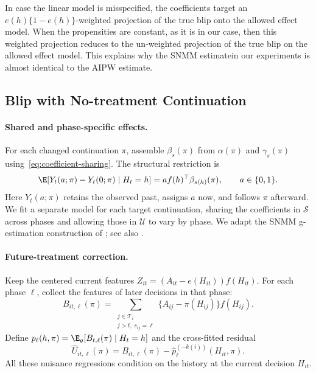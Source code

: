 In case the linear model is misspecified, the coefficients target an $e(h)\{1-e(h)\}$-weighted projection of the true blip onto the allowed effect model. When the propensities are constant, as it is in our case, then this weighted projection reduces to the un-weighted projection of the true blip on the allowed effect model. This explains why the SNMM estimatein our experiments is almost identical to the AIPW estimate.

\subsection{Blip with No-treatment Continuation}
\label{app:snmm}

\paragraph{Shared and phase-specific effects.}
For each changed continuation $\pi$, assemble $\beta_s(\pi)$ from
$\alpha(\pi)$ and $\gamma_s(\pi)$ using~\eqref{eq:coefficient-sharing}.
The structural restriction is
\begin{equation}
 \E\!\left[Y_t(a;\pi)-Y_t(0;\pi)\mid H_t=h\right]
   =a f(h)^\top\beta_{s(h)}(\pi),\qquad a\in\{0,1\}.
 \label{eq:structural}
\end{equation}
Here $Y_t(a;\pi)$ retains the observed past, assigns $a$ now, and follows $\pi$
afterward. We fit a separate model for each target continuation, sharing the
coefficients in $\mathcal S$ across phases and allowing those in $\mathcal U$
to vary by phase. We adapt the SNMM g-estimation construction of
\citet{lewis2021dynamic}; see also
\citet{vansteelandt2014snmm}.

\paragraph{Future-treatment correction.} Keep the centered current features $Z_{it}=(A_{it}-e(H_{it}))f(H_{it})$.
For each phase $\ell$, collect the features of later decisions in that phase:
\begin{equation}
 B_{it,\ell}(\pi)
   =\sum_{\substack{j\in\mathcal T_i\\j>t,\ s_{ij}=\ell}}
       \{A_{ij}-\pi(H_{ij})\}f(H_{ij}).
 \label{eq:future}
\end{equation}
 Define
$p_\ell(h,\pi)=\E_g[B_{t,\ell}(\pi)\mid H_t=h]$ and the cross-fitted residual
\[
 \widehat U_{it,\ell}(\pi)
   =B_{it,\ell}(\pi)-\widehat p_\ell^{(-k(i))}(H_{it},\pi).
\]
All these nuisance regressions condition on the history at the current decision $H_{it}$. 

